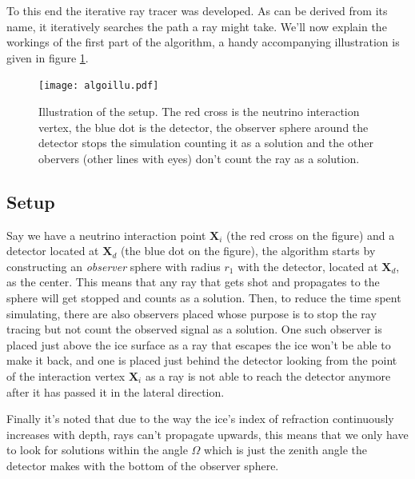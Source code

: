 To this end the iterative ray tracer \cite{2022icrc.confE1027O} was developed.
As can be derived from its name, it iteratively searches the path a ray might
take. We'll now explain the workings of the first part of the algorithm, a handy
accompanying illustration is given in figure \ref{fig:Illustration of iterative algorithm}.
\begin{figure}
  \centering
  \texttt{[image: algoillu.pdf]}
  \caption{Illustration of the setup. The red cross is the neutrino interaction vertex, the blue dot is the detector,
  the observer sphere around the detector stops the simulation counting it as a solution and the other obervers (other lines with eyes) don't count the ray as a solution.}
  \label{fig:Illustration of iterative algorithm}
\end{figure}
\subsection{Setup}
Say we have a neutrino interaction point $\mathbf{X}_i$
(the red cross on the figure) and a detector located at $\mathbf{X}_d$ (the
blue dot on the figure), the algorithm starts by constructing an
\textit{observer} sphere with radius $r_1$ with the detector, located at $\mathbf{X}_d$, as the
center.  This means that any ray that gets shot and propagates to the sphere
will get stopped and counts as a solution.  Then, to reduce the time spent simulating, there are also observers placed
whose purpose is to stop the ray tracing but not count the observed signal as a solution.
One such observer is placed 
just above the ice surface as a ray that escapes the ice won't be able to make it back, and one
is placed just behind the detector looking from the point of the interaction vertex $\mathbf{X}_i$ as
a ray is not able to reach the detector anymore after it has passed it in the
lateral direction. 

Finally it's noted that due to the way the ice's index of refraction
continuously increases with depth, rays can't propagate upwards, this means that we only 
have to look for solutions within the angle $\Omega$ which is just the zenith angle the detector
makes with the bottom of the observer sphere.

